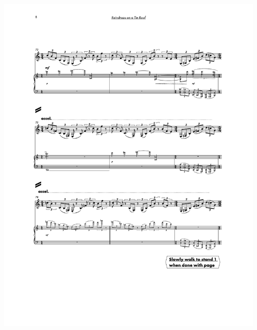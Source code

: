 \begin{center}
     \includegraphics[scale=0.75]{Scores/raindrops_Part14.pdf}
\end{center}
\newpage
